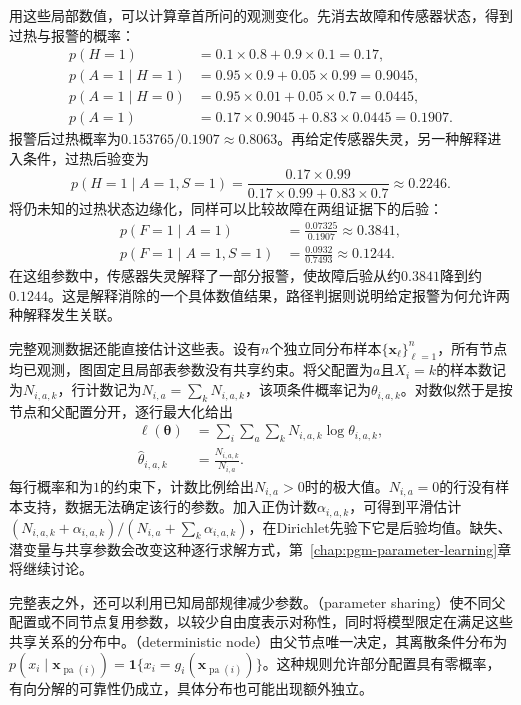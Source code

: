 用这些局部数值，可以计算章首所问的观测变化。先消去故障和传感器状态，得到过热与报警的概率：
\[
  \begin{aligned}
    p(H=1)&=0.1\times0.8+0.9\times0.1=0.17,\\
    p(A=1\mid H=1)&=0.95\times0.9+0.05\times0.99=0.9045,\\
    p(A=1\mid H=0)&=0.95\times0.01+0.05\times0.7=0.0445,\\
    p(A=1)&=0.17\times0.9045+0.83\times0.0445=0.1907.
  \end{aligned}
\]
报警后过热概率为$0.153765/0.1907\approx0.8063$。再给定传感器失灵，另一种解释进入条件，过热后验变为
\[
  p(H=1\mid A=1,S=1)
    =\frac{0.17\times0.99}
      {0.17\times0.99+0.83\times0.7}
    \approx0.2246.
\]
将仍未知的过热状态边缘化，同样可以比较故障在两组证据下的后验：
\[
  \begin{aligned}
    p(F=1\mid A=1)&=\frac{0.07325}{0.1907}\approx0.3841,\\
    p(F=1\mid A=1,S=1)&=\frac{0.0932}{0.7493}\approx0.1244.
  \end{aligned}
\]
在这组参数中，传感器失灵解释了一部分报警，使故障后验从约$0.3841$降到约$0.1244$。这是解释消除的一个具体数值结果，路径判据则说明给定报警为何允许两种解释发生关联。

完整观测数据还能直接估计这些表。设有$n$个独立同分布样本$\{\bm{x}_{\ell}\}_{\ell=1}^{n}$，所有节点均已观测，图固定且局部表参数没有共享约束。将父配置为$a$且$X_i=k$的样本数记为$N_{i,a,k}$，行计数记为$N_{i,a}=\sum_kN_{i,a,k}$，该项条件概率记为$\theta_{i,a,k}$。对数似然于是按节点和父配置分开，逐行最大化给出
\[
  \begin{aligned}
    \ell(\bm{\theta})
       &=\sum_i\sum_a\sum_kN_{i,a,k}\log\theta_{i,a,k},\\
    \widehat{\theta}_{i,a,k}&=\frac{N_{i,a,k}}{N_{i,a}}.
  \end{aligned}
\]
每行概率和为$1$的约束下，计数比例给出$N_{i,a}>0$时的极大值。$N_{i,a}=0$的行没有样本支持，数据无法确定该行的参数。加入正伪计数$\alpha_{i,a,k}$，可得到平滑估计$(N_{i,a,k}+\alpha_{i,a,k})/(N_{i,a}+\sum_k\alpha_{i,a,k})$，在Dirichlet先验下它是后验均值。缺失、潜变量与共享参数会改变这种逐行求解方式，第~\ref{chap:pgm-parameter-learning}章将继续讨论。

完整表之外，还可以利用已知局部规律减少参数。（parameter sharing）使不同父配置或不同节点复用参数，以较少自由度表示对称性，同时将模型限定在满足这些共享关系的分布中。（deterministic node）由父节点唯一决定，其离散条件分布为$p(x_i\mid\bm{x}_{\operatorname{pa}(i)})=\mathbf{1}\{x_i=g_i(\bm{x}_{\operatorname{pa}(i)})\}$。这种规则允许部分配置具有零概率，有向分解的可靠性仍成立，具体分布也可能出现额外独立。

